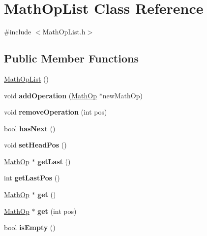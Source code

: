 \hypertarget{class_math_op_list}{}\section{Math\+Op\+List Class Reference}
\label{class_math_op_list}


{\ttfamily \#include $<$Math\+Op\+List.\+h$>$}

\subsection*{Public Member Functions}
\begin{DoxyCompactItemize}
\item 
\hyperlink{class_math_op_list_a37a40785be076d9b0c18c86e2cf74830}{Math\+Op\+List} ()
\item 
\hypertarget{class_math_op_list_a5316d3bc11507fbb0c1accc8f50ef44b}{}void {\bfseries add\+Operation} (\hyperlink{class_math_op}{Math\+Op} $\ast$new\+Math\+Op)\label{class_math_op_list_a5316d3bc11507fbb0c1accc8f50ef44b}

\item 
\hypertarget{class_math_op_list_a8a8912d6b56b82ce57c2f8438ffcf1c3}{}void {\bfseries remove\+Operation} (int pos)\label{class_math_op_list_a8a8912d6b56b82ce57c2f8438ffcf1c3}

\item 
\hypertarget{class_math_op_list_a03cb8ae4c430d44ad0da52f92e08dce9}{}bool {\bfseries has\+Next} ()\label{class_math_op_list_a03cb8ae4c430d44ad0da52f92e08dce9}

\item 
\hypertarget{class_math_op_list_aea70a75d82a00034f5f2fb2aa5b16b22}{}void {\bfseries set\+Head\+Pos} ()\label{class_math_op_list_aea70a75d82a00034f5f2fb2aa5b16b22}

\item 
\hypertarget{class_math_op_list_a20880de2f17a1f883b5254603325e38f}{}\hyperlink{class_math_op}{Math\+Op} $\ast$ {\bfseries get\+Last} ()\label{class_math_op_list_a20880de2f17a1f883b5254603325e38f}

\item 
\hypertarget{class_math_op_list_ad062e78175b80791fa07ee08f4dbe0d5}{}int {\bfseries get\+Last\+Pos} ()\label{class_math_op_list_ad062e78175b80791fa07ee08f4dbe0d5}

\item 
\hypertarget{class_math_op_list_a57a567366dd8f83779d6040c9fb017c4}{}\hyperlink{class_math_op}{Math\+Op} $\ast$ {\bfseries get} ()\label{class_math_op_list_a57a567366dd8f83779d6040c9fb017c4}

\item 
\hypertarget{class_math_op_list_a4c6555e072ee3280f8d7fd93551f4513}{}\hyperlink{class_math_op}{Math\+Op} $\ast$ {\bfseries get} (int pos)\label{class_math_op_list_a4c6555e072ee3280f8d7fd93551f4513}

\item 
\hypertarget{class_math_op_list_a18e3ee1871a887d1428072f98f1c5cbd}{}bool {\bfseries is\+Empty} ()\label{class_math_op_list_a18e3ee1871a887d1428072f98f1c5cbd}

\end{DoxyCompactItemize}
